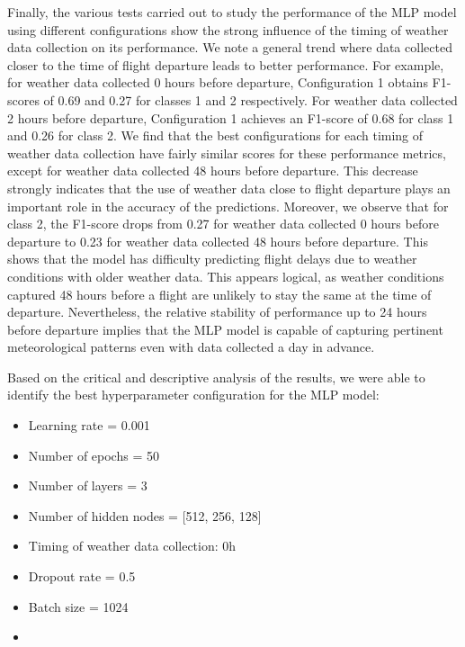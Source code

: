 \documentclass[12pt,oneside]{book} %
\begin{document}
\noindent Finally, the various tests carried out to study the performance of the MLP model using different configurations show the strong influence of the timing of weather data collection on its performance. We note a general trend where data collected closer to the time of flight departure leads to better performance. For example, for weather data collected 0 hours before departure, Configuration 1 obtains F1-scores of 0.69 and 0.27 for classes 1 and 2 respectively. For weather data collected 2 hours before departure, Configuration 1 achieves an F1-score of 0.68 for class 1 and 0.26 for class 2. We find that the best configurations for each timing of weather data collection have fairly similar scores for these performance metrics, except for weather data collected 48 hours before departure. This decrease strongly indicates that the use of weather data close to flight departure plays an important role in the accuracy of the predictions. Moreover, we observe that for class 2, the F1-score drops from 0.27 for weather data collected 0 hours before departure to 0.23 for weather data collected 48 hours before departure. This shows that the model has difficulty predicting flight delays due to weather conditions with older weather data. This appears logical, as weather conditions captured 48 hours before a flight are unlikely to stay the same at the time of departure. Nevertheless, the relative stability of performance up to 24 hours before departure implies that the MLP model is capable of capturing pertinent meteorological patterns even with data collected a day in advance.

\noindent Based on the critical and descriptive analysis of the results, we were able to identify the best hyperparameter configuration for the MLP model:
\begin{multicols}{2}
    \begin{itemize}
        \item Learning rate = 0.001
        \item Number of epochs = 50
        \item Number of layers = 3
        \item Number of hidden nodes = [512, 256, 128]
    \end{itemize}
    \begin{itemize}
         \item Timing of weather data collection: 0h
         \item Dropout rate  = 0.5
         \item Batch size = 1024
         \item[\hspace{0pt}]
    \end{itemize}
\end{multicols}
\end{document}
